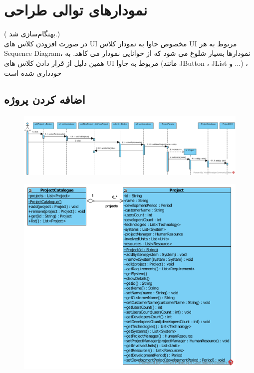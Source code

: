 \chapter{نمودارهای توالی طراحی}
({\color{red}  بهنگام‌سازی شد.})\\
در صورت افزودن کلاس های UI مخصوص جاوا به نمودار کلاس UI مربوط به هر Sequence Diagram، نمودارها بسیار شلوغ می شود که از خوانایی نمودار می کاهد. به همین دلیل از قرار دادن کلاس های UI مربوط به جاوا (مانند JButton ، JList و ...) ، خودداری شده است

\begin{landscape}
\newpage
\section{اضافه کردن پروژه}
\begin{figure}[H]
	\centering
	\includegraphics[scale=0.6]{img/sequence-design/AddProjectToOrganization}
\end{figure}
\begin{figure}[H]
	\centering
	\includegraphics[scale=0.3]{img/sequence-design/AddProjectToOrganizationC}

\end{figure}
\end{landscape}
